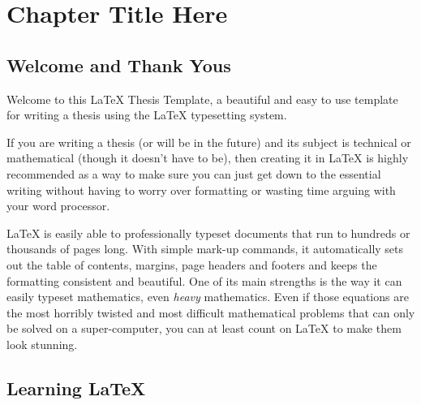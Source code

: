 
\chapter{Chapter Title Here} %

\label{ChapterX} %


\newcommand{\keyword}[1]{\textbf{#1}} \newcommand{\tabhead}[1]{\textbf{#1}}
\newcommand{\code}[1]{\texttt{#1}} \newcommand{\file}[1]{\texttt{\bfseries#1}}
\newcommand{\option}[1]{\texttt{\itshape#1}}


\section{Welcome and Thank Yous}
Welcome to this \LaTeX{} Thesis Template, a beautiful and easy to use template for writing
a thesis using the \LaTeX{} typesetting system.

If you are writing a thesis (or will be in the future) and its subject is technical or
mathematical (though it doesn't have to be), then creating it in \LaTeX{} is highly
recommended as a way to make sure you can just get down to the essential writing without
having to worry over formatting or wasting time arguing with your word processor.

\LaTeX{} is easily able to professionally typeset documents that run to hundreds or
thousands of pages long. With simple mark-up commands, it automatically sets out the table
of contents, margins, page headers and footers and keeps the formatting consistent and
beautiful. One of its main strengths is the way it can easily typeset mathematics, even
\emph{heavy} mathematics. Even if those equations are the most horribly twisted and most
difficult mathematical problems that can only be solved on a super-computer, you can at
least count on \LaTeX{} to make them look stunning.


\section{Learning \LaTeX{}}

